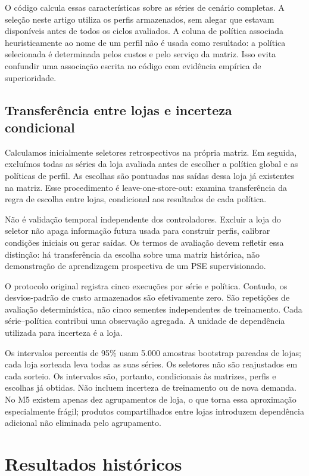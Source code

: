 \documentclass[preprint,12pt]{elsarticle}
\begin{document}
O código calcula essas características sobre as séries de cenário completas. A seleção neste artigo utiliza os perfis armazenados, sem alegar que estavam disponíveis antes de todos os ciclos avaliados. A coluna de política associada heuristicamente ao nome de um perfil não é usada como resultado: a política selecionada é determinada pelos custos e pelo serviço da matriz. Isso evita confundir uma associação escrita no código com evidência empírica de superioridade.

\subsection{Transferência entre lojas e incerteza condicional}
Calculamos inicialmente seletores retrospectivos na própria matriz. Em seguida, excluímos todas as séries da loja avaliada antes de escolher a política global e as políticas de perfil. As escolhas são pontuadas nas saídas dessa loja já existentes na matriz. Esse procedimento é leave-one-store-out: examina transferência da regra de escolha entre lojas, condicional aos resultados de cada política.

Não é validação temporal independente dos controladores. Excluir a loja do seletor não apaga informação futura usada para construir perfis, calibrar condições iniciais ou gerar saídas. Os termos de avaliação devem refletir essa distinção: há transferência da escolha sobre uma matriz histórica, não demonstração de aprendizagem prospectiva de um PSE supervisionado.

O protocolo original registra cinco execuções por série e política. Contudo, os desvios-padrão de custo armazenados são efetivamente zero. São repetições de avaliação determinística, não cinco sementes independentes de treinamento. Cada série--política contribui uma observação agregada. A unidade de dependência utilizada para incerteza é a loja.

Os intervalos percentis de 95\% usam 5.000 amostras bootstrap pareadas de lojas; cada loja sorteada leva todas as suas séries. Os seletores não são reajustados em cada sorteio. Os intervalos são, portanto, condicionais às matrizes, perfis e escolhas já obtidas. Não incluem incerteza de treinamento ou de nova demanda. No M5 existem apenas dez agrupamentos de loja, o que torna essa aproximação especialmente frágil; produtos compartilhados entre lojas introduzem dependência adicional não eliminada pelo agrupamento.

\section{Resultados históricos}
\end{document}
